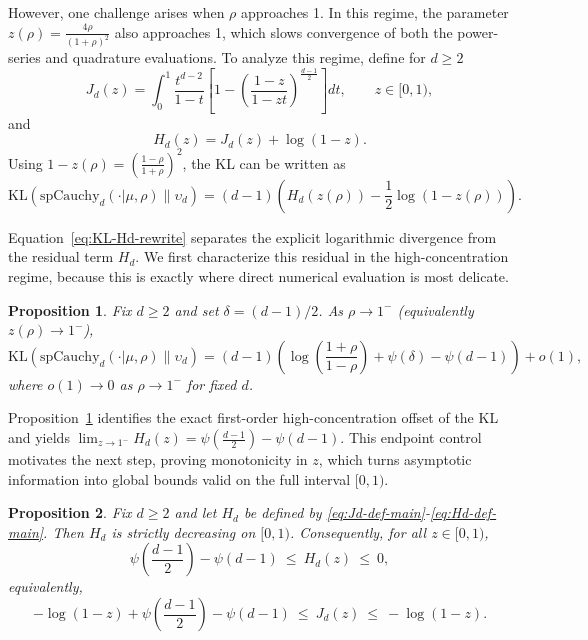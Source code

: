 \documentclass{article}
\newtheorem{prop}{Proposition}
\begin{document}
However, one challenge arises when \( \rho \) approaches 1. In this regime, the parameter \( z(\rho) = \frac{4\rho}{(1+\rho)^2} \) also approaches 1, which slows convergence of both the power-series and quadrature evaluations.
To analyze this regime, define for \(d\ge 2\)
\begin{equation}
J_d(z)=\int_0^1 \frac{t^{d-2}}{1-t}\left[1-\left(\frac{1-z}{1-zt}\right)^{\frac{d-1}{2}}\right]dt,
\qquad z\in[0,1),
\label{eq:Jd-def-main}
\end{equation}
and
\begin{equation}
H_d(z)=J_d(z)+\log(1-z).
\label{eq:Hd-def-main}
\end{equation}
Using \(1-z(\rho)=\left(\frac{1-\rho}{1+\rho}\right)^2\), the KL can be written as
\begin{equation}
\mathrm{KL}(\mathrm{spCauchy}_d(\cdot|\mu,\rho)\|\upsilon_d)
=(d-1)\left(H_d(z(\rho)) - \frac{1}{2}\log(1-z(\rho))\right).
\label{eq:KL-Hd-rewrite}
\end{equation}

Equation~\eqref{eq:KL-Hd-rewrite} separates the explicit logarithmic divergence from the residual term \(H_d\). We first characterize this residual in the high-concentration regime, because this is exactly where direct numerical evaluation is most delicate.

\begin{prop}\label{p2}
Fix \(d\ge 2\) and set \(\delta=(d-1)/2\). As \(\rho\to 1^-\) (equivalently \(z(\rho)\to 1^-\)),
\[
\mathrm{KL}(\mathrm{spCauchy}_d(\cdot|\mu,\rho)\|\upsilon_d)
= (d-1)\left(\log\left(\frac{1+\rho}{1-\rho}\right) + \psi\left(\delta\right) - \psi(d-1)\right) + o(1),
\]
where \(o(1)\to 0\) as \(\rho\to 1^-\) for fixed \(d\).
\end{prop}

Proposition~\ref{p2} identifies the exact first-order high-concentration offset of the KL and yields
\(\lim_{z\to 1^-}H_d(z)=\psi\left(\frac{d-1}{2}\right)-\psi(d-1)\).
This endpoint control motivates the next step, proving monotonicity in \(z\), which turns asymptotic information into global bounds valid on the full interval \([0,1)\).

\begin{prop}\label{p:Hd-monotone}
Fix \(d\ge 2\) and let \(H_d\) be defined by \eqref{eq:Jd-def-main}-\eqref{eq:Hd-def-main}.
Then \(H_d\) is strictly decreasing on \([0,1)\). Consequently, for all \(z\in[0,1)\),
\[
\psi\left(\frac{d-1}{2}\right)-\psi(d-1)\ \le\ H_d(z)\ \le\ 0,
\]
equivalently,
\[
-\log(1-z)+\psi\left(\frac{d-1}{2}\right)-\psi(d-1)
\ \le\ J_d(z)\ \le\ -\log(1-z).
\]
\end{prop}
\end{document}
